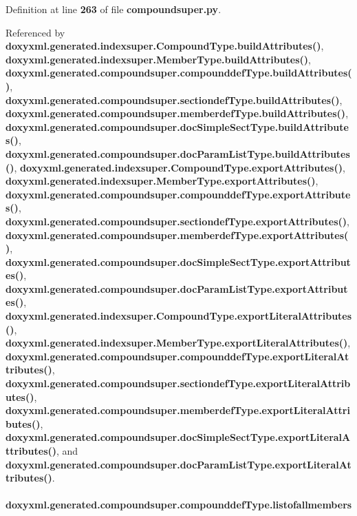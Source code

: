 Definition at line {\bf 263} of file {\bf compoundsuper.\+py}.



Referenced by {\bf doxyxml.\+generated.\+indexsuper.\+Compound\+Type.\+build\+Attributes()}, {\bf doxyxml.\+generated.\+indexsuper.\+Member\+Type.\+build\+Attributes()}, {\bf doxyxml.\+generated.\+compoundsuper.\+compounddef\+Type.\+build\+Attributes()}, {\bf doxyxml.\+generated.\+compoundsuper.\+sectiondef\+Type.\+build\+Attributes()}, {\bf doxyxml.\+generated.\+compoundsuper.\+memberdef\+Type.\+build\+Attributes()}, {\bf doxyxml.\+generated.\+compoundsuper.\+doc\+Simple\+Sect\+Type.\+build\+Attributes()}, {\bf doxyxml.\+generated.\+compoundsuper.\+doc\+Param\+List\+Type.\+build\+Attributes()}, {\bf doxyxml.\+generated.\+indexsuper.\+Compound\+Type.\+export\+Attributes()}, {\bf doxyxml.\+generated.\+indexsuper.\+Member\+Type.\+export\+Attributes()}, {\bf doxyxml.\+generated.\+compoundsuper.\+compounddef\+Type.\+export\+Attributes()}, {\bf doxyxml.\+generated.\+compoundsuper.\+sectiondef\+Type.\+export\+Attributes()}, {\bf doxyxml.\+generated.\+compoundsuper.\+memberdef\+Type.\+export\+Attributes()}, {\bf doxyxml.\+generated.\+compoundsuper.\+doc\+Simple\+Sect\+Type.\+export\+Attributes()}, {\bf doxyxml.\+generated.\+compoundsuper.\+doc\+Param\+List\+Type.\+export\+Attributes()}, {\bf doxyxml.\+generated.\+indexsuper.\+Compound\+Type.\+export\+Literal\+Attributes()}, {\bf doxyxml.\+generated.\+indexsuper.\+Member\+Type.\+export\+Literal\+Attributes()}, {\bf doxyxml.\+generated.\+compoundsuper.\+compounddef\+Type.\+export\+Literal\+Attributes()}, {\bf doxyxml.\+generated.\+compoundsuper.\+sectiondef\+Type.\+export\+Literal\+Attributes()}, {\bf doxyxml.\+generated.\+compoundsuper.\+memberdef\+Type.\+export\+Literal\+Attributes()}, {\bf doxyxml.\+generated.\+compoundsuper.\+doc\+Simple\+Sect\+Type.\+export\+Literal\+Attributes()}, and {\bf doxyxml.\+generated.\+compoundsuper.\+doc\+Param\+List\+Type.\+export\+Literal\+Attributes()}.

\paragraph[{listofallmembers}]{\setlength{\rightskip}{0pt plus 5cm}doxyxml.\+generated.\+compoundsuper.\+compounddef\+Type.\+listofallmembers}\label{classdoxyxml_1_1generated_1_1compoundsuper_1_1compounddefType_a750080ab00dc88ab1b55c3cd1d3b6c84}


